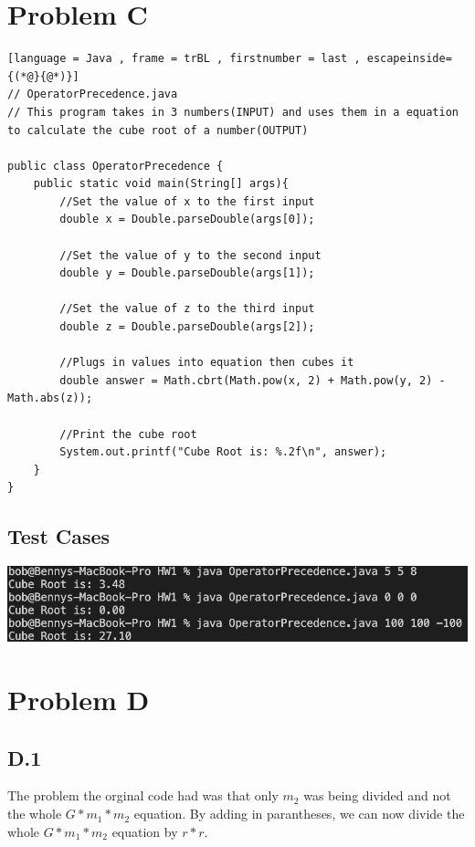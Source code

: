 \documentclass{article}
\begin{document}
\section{Problem C}

\begin{lstlisting}[language = Java , frame = trBL , firstnumber = last , escapeinside={(*@}{@*)}]
// OperatorPrecedence.java
// This program takes in 3 numbers(INPUT) and uses them in a equation to calculate the cube root of a number(OUTPUT)

public class OperatorPrecedence {
    public static void main(String[] args){
        //Set the value of x to the first input
        double x = Double.parseDouble(args[0]);

        //Set the value of y to the second input
        double y = Double.parseDouble(args[1]); 
        
        //Set the value of z to the third input
        double z = Double.parseDouble(args[2]); 
        
        //Plugs in values into equation then cubes it
        double answer = Math.cbrt(Math.pow(x, 2) + Math.pow(y, 2) - Math.abs(z)); 

        //Print the cube root
        System.out.printf("Cube Root is: %.2f\n", answer); 
    }
}
\end{lstlisting}

\subsection*{Test Cases}

\begin{center}
    \includegraphics*[scale = .65]{./images/q3test.png}
\end{center}

\section{Problem D}

\subsection*{D.1}

The problem the orginal code had was that only $m_2$ was being divided and not the whole $G * m_1 * m_2$ equation. By adding in parantheses, we can now divide the whole $G * m_1 * m_2$ equation by $r * r$.
\end{document}
